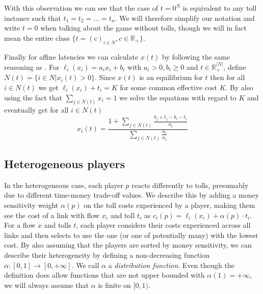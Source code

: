 \documentclass[10pt,a4paper]{book}
\newcommand{\R}{\mathbb{R}}
\theoremstyle{definition}
\theoremstyle{comment}
\begin{document}
With this observation we can see that the case of $t = 0^N$ is equivalent to any toll instance such that $t_1 = t_2 = \dots = t_n$.
We will therefore simplify our notation and write $t = 0$ when talking about the game without tolls, though we will in fact mean the entire class $\{t = (c)_{i \in N}, c \in \R_+\}$.

Finally for affine latencies we can calculate $x(t)$ by following the same reasoning as \cite[Prop $3.1$]{Harks_2019}.
For $\ell_i(x_i) = a_i x_i + b_i$ with $a_i > 0, b_i \geq 0$ and $t \in \R_+^{|N|}$, define $N(t) = \{i \in N | x_i(t) > 0\}$.
Since $x(t)$ is an equilibrium for $t$ then for all $i \in N(t)$ we get $\ell_i(x_i) + t_i = K$ for some common effective cost $K$.
By also using the fact that $\sum_{j \in N(t)} x_i = 1$ we solve the equations with regard to $K$ and eventually get for all $i \in N(t)$
\begin{equation}
	\label{eq:homogeneous_x_i}
	x_i(t) = \frac{1 + \sum_{j \in N(t)}\frac{b_j + t_j - b_i - t_i}{a_j}}{\sum_{j \in N(t)}\frac{a_i}{a_j}}
\end{equation}

\subsection*{Heterogeneous players}

In the heterogeneous case, each player $p$ reacts differently to tolls, presumably due to different time-money trade-off values.
We describe this by adding a money sensitivity weight $\alpha(p)$ on the toll costs experienced by a player, making them see the cost of a link with flow $x_i$ and toll $t_i$ as $c_i(p) = \ell_i(x_i) + \alpha(p) \cdot t_i$.
For a flow $x$ and tolls $t$, each player considers their costs experienced across all links and then selects to use the one (or one of potentially many) with the lowest cost. 
By also assuming that the players are sorted by money sensitivity, we can describe their heterogeneity by defining a non-decreasing function $\alpha: [0, 1] \rightarrow [0, +\infty]$.
We call $\alpha$ a \textit{distribution function}.
Even though the definition does allow functions that are not upper bounded with $\alpha(1) = +\infty$, we will always assume that $\alpha$ is finite on $[0, 1)$.
\end{document}
